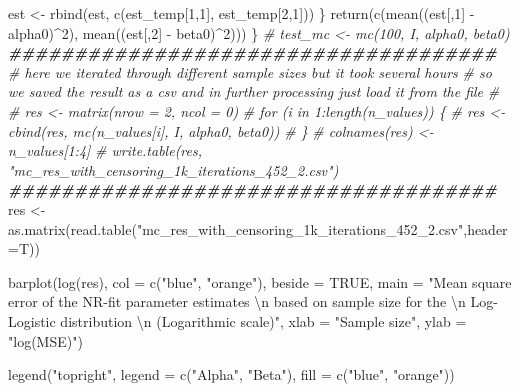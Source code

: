 \documentclass[
]{article}
\newenvironment{Shaded}{\begin{snugshade}}{\end{snugshade}}
\newcommand{\AttributeTok}[1]{\textcolor[rgb]{0.77,0.63,0.00}{#1}}
\newcommand{\CommentTok}[1]{\textcolor[rgb]{0.56,0.35,0.01}{\textit{#1}}}
\newcommand{\ConstantTok}[1]{\textcolor[rgb]{0.00,0.00,0.00}{#1}}
\newcommand{\DecValTok}[1]{\textcolor[rgb]{0.00,0.00,0.81}{#1}}
\newcommand{\DocumentationTok}[1]{\textcolor[rgb]{0.56,0.35,0.01}{\textbf{\textit{#1}}}}
\newcommand{\FunctionTok}[1]{\textcolor[rgb]{0.00,0.00,0.00}{#1}}
\newcommand{\NormalTok}[1]{#1}
\newcommand{\OtherTok}[1]{\textcolor[rgb]{0.56,0.35,0.01}{#1}}
\newcommand{\SpecialCharTok}[1]{\textcolor[rgb]{0.00,0.00,0.00}{#1}}
\newcommand{\StringTok}[1]{\textcolor[rgb]{0.31,0.60,0.02}{#1}}
\begin{document}
\begin{Shaded}
\begin{Highlighting}[]
\NormalTok{    est }\OtherTok{\textless{}{-}} \FunctionTok{rbind}\NormalTok{(est, }\FunctionTok{c}\NormalTok{(est\_temp[}\DecValTok{1}\NormalTok{,}\DecValTok{1}\NormalTok{], est\_temp[}\DecValTok{2}\NormalTok{,}\DecValTok{1}\NormalTok{]))}
\NormalTok{  \}}
  \FunctionTok{return}\NormalTok{(}\FunctionTok{c}\NormalTok{(}\FunctionTok{mean}\NormalTok{((est[,}\DecValTok{1}\NormalTok{] }\SpecialCharTok{{-}}\NormalTok{ alpha0)}\SpecialCharTok{\^{}}\DecValTok{2}\NormalTok{), }\FunctionTok{mean}\NormalTok{((est[,}\DecValTok{2}\NormalTok{] }\SpecialCharTok{{-}}\NormalTok{ beta0)}\SpecialCharTok{\^{}}\DecValTok{2}\NormalTok{)))}
\NormalTok{\}}
\CommentTok{\# test\_mc \textless{}{-} mc(100, I, alpha0, beta0)}
\DocumentationTok{\#\#\#\#\#\#\#\#\#\#\#\#\#\#\#\#\#\#\#\#\#\#\#\#\#\#\#\#\#\#\#\#\#\#\#\#\#}
\CommentTok{\# here we iterated through different sample sizes but it took several hours}
\CommentTok{\# so we saved the result as a csv and in further processing just load it from the file}
\CommentTok{\#}
\CommentTok{\# res \textless{}{-} matrix(nrow = 2, ncol = 0)}
\CommentTok{\# for (i in 1:length(n\_values)) \{}
\CommentTok{\#   res \textless{}{-} cbind(res, mc(n\_values[i], I, alpha0, beta0))}
\CommentTok{\# \}}
\CommentTok{\# colnames(res) \textless{}{-} n\_values[1:4]}
\CommentTok{\# write.table(res, "mc\_res\_with\_censoring\_1k\_iterations\_452\_2.csv")}
\DocumentationTok{\#\#\#\#\#\#\#\#\#\#\#\#\#\#\#\#\#\#\#\#\#\#\#\#\#\#\#\#\#\#\#\#\#\#\#\#\#}
\NormalTok{res }\OtherTok{\textless{}{-}} \FunctionTok{as.matrix}\NormalTok{(}\FunctionTok{read.table}\NormalTok{(}\StringTok{"mc\_res\_with\_censoring\_1k\_iterations\_452\_2.csv"}\NormalTok{,}\AttributeTok{header=}\NormalTok{T))}

\FunctionTok{barplot}\NormalTok{(}\FunctionTok{log}\NormalTok{(res),}
        \AttributeTok{col =} \FunctionTok{c}\NormalTok{(}\StringTok{"blue"}\NormalTok{, }\StringTok{"orange"}\NormalTok{),}
        \AttributeTok{beside =} \ConstantTok{TRUE}\NormalTok{,}
        \AttributeTok{main =} \StringTok{"Mean square error of the NR{-}fit parameter estimates }\SpecialCharTok{\textbackslash{}n}\StringTok{ based on sample size for the }\SpecialCharTok{\textbackslash{}n}\StringTok{ Log{-}Logistic distribution }\SpecialCharTok{\textbackslash{}n}\StringTok{ (Logarithmic scale)"}\NormalTok{, }\AttributeTok{xlab =} \StringTok{"Sample size"}\NormalTok{, }\AttributeTok{ylab =} \StringTok{"log(MSE)"}\NormalTok{)}


\FunctionTok{legend}\NormalTok{(}\StringTok{"topright"}\NormalTok{,}
       \AttributeTok{legend =} \FunctionTok{c}\NormalTok{(}\StringTok{"Alpha"}\NormalTok{, }\StringTok{"Beta"}\NormalTok{),}
       \AttributeTok{fill =} \FunctionTok{c}\NormalTok{(}\StringTok{"blue"}\NormalTok{, }\StringTok{"orange"}\NormalTok{))}
\end{Highlighting}
\end{Shaded}
\end{document}
